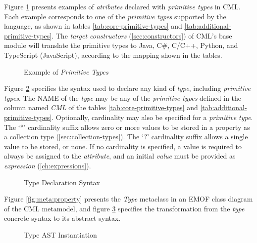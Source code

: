 \begin{examples}
Figure \ref{fig:ex:primitive-types} presents examples
of \emph{atributes} declared with \emph{primitive types} in CML.
Each example corresponds to one of the \emph{primitive types} 
supported by the language,
as shown in tables \ref{tab:core-primitive-types} and \ref{tab:additional-primitive-types}.
The \emph{target constructors} (\ref{sec:constructors})
of CML's base module will translate the primitive types to Java, C\#, C/C++,
Python, and TypeScript (JavaScript),
according to the mapping shown in the tables.

\end{examples}

\begin{figure}
\verbatimfont{\small}

\caption{Example of \emph{Primitive Types}}
\label{fig:ex:primitive-types}
\end{figure}

\begin{concrete-syntax}
Figure \ref{fig:stx:type} specifies the syntax used
to declare any kind of \emph{type},
including \emph{primitive types}.
The NAME of the \emph{type} may be any of the \emph{primitive types}
defined in the column named \emph{CML}
of the tables \ref{tab:core-primitive-types} and \ref{tab:additional-primitive-types}.
Optionally, cardinality may also be specified
for a \emph{primitive type}.
The `*' cardinality suffix allows zero or more values to be stored
in a property as a collection type (\ref{sec:collection-types}).
The `?' cardinality suffix allows a single value to be stored, or none.
If no cardinality is specified,
a value is required to always be assigned to the \emph{attribute},
and an initial \emph{value} must be provided as \emph{expression} (\ref{ch:expressions}).
\end{concrete-syntax}

\begin{figure}
\verbatimfont{\small}

\caption{Type Declaration Syntax}
\label{fig:stx:type}
\end{figure}

\begin{abstract-syntax}
Figure \ref{fig:meta:property} presents the \emph{Type} metaclass
in an EMOF \cite{mof} class diagram of the CML metamodel,
and figure \ref{fig:ast:type} specifies
the transformation
from the \emph{type} concrete syntax to its abstract syntax.
\end{abstract-syntax}

\begin{figure}
\verbatimfont{\small}

\caption{Type AST Instantiation}
\label{fig:ast:type}
\end{figure}
